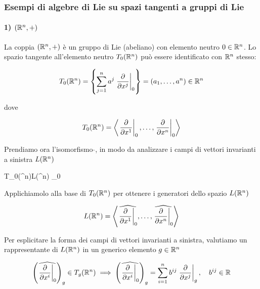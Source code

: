\subsubsection{Esempi di algebre di Lie su spazi tangenti a gruppi di Lie}

\paragraph{1) $ (\mathbb{R}^{n},+) $}

La coppia $ (\mathbb{R}^{n},+) $ è un gruppo di Lie (abeliano) con elemento neutro $ 0 \in \mathbb{R}^{n} $. Lo spazio tangente all'elemento neutro $ T_{0}(\mathbb{R}^{n}) $ può essere identificato con $ \mathbb{R}^{n} $ stesso:

\begin{equation}
	T_{0}(\R^{n}) = \left\{ \sum_{j=1}^{n} a^{j} \eval{\pdv{x^{j}}}_{0} \right\} = (a_{1},\dots,a^{n}) \in \R^{n}
\end{equation}

dove

\begin{equation}
	T_{0}(\R^{n}) = \ev{ \eval{ \pdv{x^{1}} }_{0}, \dots, \eval{ \pdv{x^{n}} }_{0} }
\end{equation}

Prendiamo ora l'isomorfismo $ \hat{} $, in modo da analizzare i campi di vettori invarianti a sinistra $ L(\mathbb{R}^{n}) $

\map{\hat{}}%
	{T_{0}(\R^{n})}{L(\R^{n})}%
	{_{0}}{}

Applichiamolo alla base di $ T_{0}(\mathbb{R}^{n}) $ per ottenere i generatori dello spazio $ L(\mathbb{R}^{n}) $

\begin{equation}
	L(\R^{n}) = \ev{ \widehat{ \eval{ \pdv{x^{1}} }_{0} }, \dots, \widehat{ \eval{ \pdv{x^{n}} }_{0} } }
\end{equation}

Per esplicitare la forma dei campi di vettori invarianti a sinistra, valutiamo un rappresentante di $ L(\mathbb{R}^{n}) $ in un generico elemento $ g \in \mathbb{R}^{n} $

\begin{align}
	\begin{split}
		\left( \widehat{ \eval{ \pdv{x^{i}} }_{0} } \right)_{g} \in T_{g}(\R^{n}) %
		\implies%
		\left( \widehat{ \eval{ \pdv{x^{i}} }_{0} } \right)_{g} = \sum_{i=1}^{n} b^{ij} \eval{ \pdv{x^{j}} }_{g} \qcomma b^{ij} \in \R
	\end{split}
\end{align}

